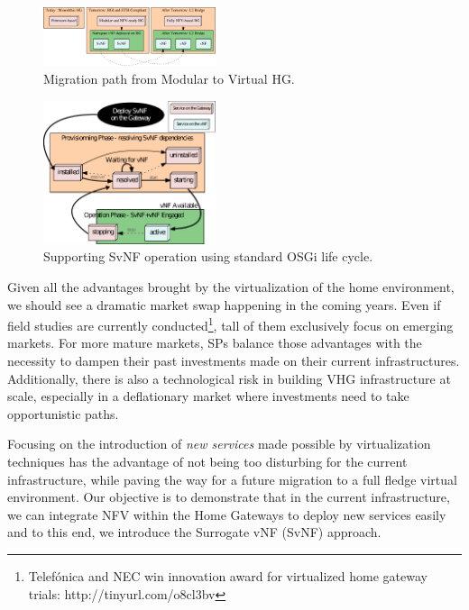 \begin{figure}
  \begin{center}
    \includegraphics[width=0.45\textwidth]{fig/migrationPath.pdf}
  \end{center}
  \caption{ Migration path from Modular to Virtual HG.
    \label{fig:migration}
  }
\end{figure}	

\begin{figure}
	
	\center

	\includegraphics[width=0.45\textwidth]{fig/osgi.pdf}
	\caption{ Supporting SvNF operation using standard OSGi life cycle.
    \label{fig:osgisvnf}
    }

\end{figure}
	   

Given all the advantages brought by the virtualization of the home environment, we should see a dramatic market swap  happening in the coming years.
Even if field studies are currently conducted\footnote{Telefónica and NEC win innovation award for virtualized home gateway trials: http://tinyurl.com/o8cl3bv}, tall of them exclusively focus on emerging markets.
For more mature markets, SPs balance those advantages with the necessity to dampen their past investments made on their current infrastructures.
Additionally, there is also a technological risk in building VHG infrastructure at scale, especially in a deflationary market where investments need to take opportunistic paths. 

Focusing on the introduction of \textit{new services} made possible by virtualization techniques has the advantage of not being too disturbing for the current infrastructure, while paving the way for a future migration to a full fledge virtual environment. 
Our objective is to demonstrate that in the current infrastructure, we can integrate NFV within the Home Gateways to deploy new services easily and to this end, we introduce the Surrogate vNF (SvNF) approach.

